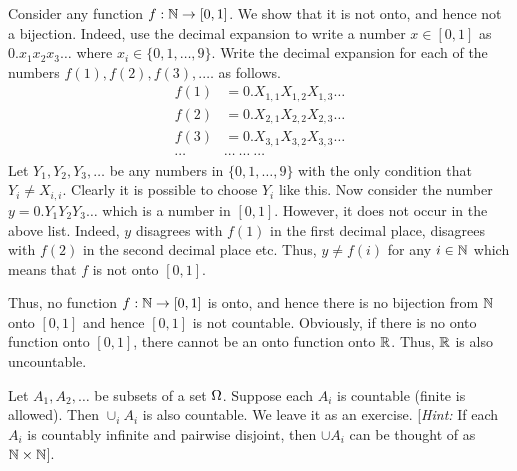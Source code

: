 \documentclass[preprint,  11pt]{amsart}
\begin{document}
Consider any function $f:\mathbb{N} \rightarrow [0,1]$. We show that it is not onto, and hence not a bijection. Indeed, use the decimal expansion to write a number $x\in [0,1]$ as $0.x_{1}x_{2}x_{3}\ldots$ where $x_{i}\in \{0,1,\ldots ,9\}$. Write the decimal expansion for each of the numbers $f(1),f(2),f(3),.\ldots$ as follows.
\begin{align*}
f(1)&=0.X_{1,1}X_{1,2}X_{1,3}\ldots \\
f(2)&=0.X_{2,1}X_{2,2}X_{2,3}\ldots \\
f(3)&=0.X_{3,1}X_{3,2}X_{3,3}\ldots \\
\cdots & \cdots \; \cdots \; \cdots
\end{align*}
Let $Y_{1},Y_{2},Y_{3},\ldots$ be any numbers in $\{0,1,\ldots ,9\}$ with the only condition that $Y_{i}\not= X_{i,i}$. Clearly it is possible to choose $Y_{i}$ like this. Now consider the number $y=0.Y_{1}Y_{2}Y_{3}\ldots$ which is a number in $[0,1]$. However, it does not occur in the above list. Indeed, $y$ disagrees with $f(1)$ in the first decimal place, disagrees with $f(2)$ in the second decimal place etc. Thus, $y\not= f(i)$ for any $i\in \mathbb{N}$ which means that $f$ is not onto $[0,1]$. 

Thus, no function $f:\mathbb{N}\rightarrow [0,1]$ is onto, and hence there is no bijection from $\mathbb{N}$ onto $[0,1]$ and hence $[0,1]$ is not countable. Obviously, if there is no onto function onto $[0,1]$, there cannot be an onto function onto $\mathbb{R}$. Thus, $\mathbb{R}$ is also uncountable.
\eeg

\beg Let $A_{1},A_{2},\ldots $ be subsets of a set $\Omega$. Suppose each $A_{i}$ is countable (finite is allowed). Then $\cup_{i}A_{i}$ is also countable. We leave it as an exercise. [{\em Hint:} If each $A_{i}$ is countably infinite and pairwise disjoint, then $\cup A_{i}$ can be thought of as $\mathbb{N}\times \mathbb{N}$].
\eeg
\end{document}
